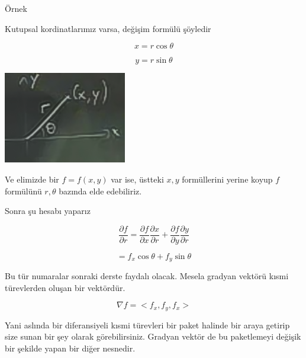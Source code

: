 \documentclass[12pt,fleqn]{article}\usepackage{../../common}
\begin{document}
Örnek

Kutupsal kordinatlarımız varsa, değişim formülü şöyledir

$$ x = r \cos \theta $$

$$ y = r \sin \theta $$

\begin{center}
\includegraphics[height=4cm]{11_1.png}
\end{center}

Ve elimizde bir $f=f(x,y)$ var ise, üstteki $x,y$ formüllerini yerine koyup $f$
formülünü $r,\theta$ bazında elde edebiliriz.

Sonra şu hesabı yaparız

$$ 
\frac{\partial f}{\partial r} = 
\frac{\partial f}{\partial x}
\frac{\partial x}{\partial r} +
\frac{\partial f}{\partial y}
\frac{\partial y}{\partial r}
$$

$$ = f_x\cos \theta + f_y \sin \theta $$

Bu tür numaralar sonraki derste faydalı olacak. Mesela gradyan vektörü
kısmi türevlerden oluşan bir vektördür. 

$$ \nabla f = < f_x,f_y,f_x > $$

Yani aslında bir diferansiyeli kısmi türevleri bir paket halinde bir araya
getirip size sunan bir şey olarak görebilirsiniz. Gradyan vektör de bu
paketlemeyi değişik bir şekilde yapan bir diğer nesnedir. 
\end{document}
